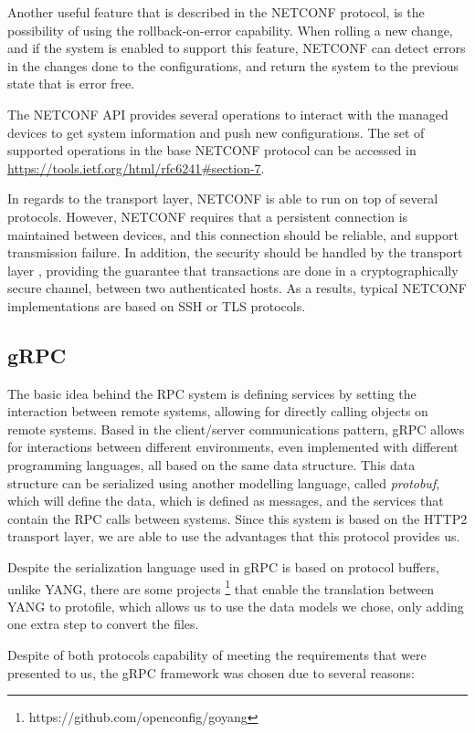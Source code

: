 \par Another useful feature that is described in the NETCONF protocol, is the possibility of using the rollback-on-error capability. When rolling a new change, and if the system is enabled to support this feature,
NETCONF can detect errors in the changes done to the configurations, and return the system to the previous state that is error free. 

\par The NETCONF API provides several operations to interact with the managed devices to get system information and push new configurations. The set of supported operations in the base NETCONF protocol can be accessed in 
\url{https://tools.ietf.org/html/rfc6241#section-7}. 

\par In regards to the transport layer, NETCONF is able to run on top of several protocols. However, NETCONF requires that a persistent connection is maintained between devices, and this connection should be reliable, and support
transmission failure. In addition, the security should be handled by the transport layer \cite { CITE - https://www.ietf.org/slides/slides-edu-netconf-yang-00.pdf}, providing the guarantee that transactions are done in a 
cryptographically secure channel, between two authenticated hosts. As a results, typical NETCONF implementations are based on SSH or TLS protocols.

\subsection {gRPC}  \label {ssec:grpc}

The basic idea behind the RPC system is defining services by setting the interaction between remote systems, allowing for directly calling objects on remote systems. Based in the client/server communications 
pattern, gRPC allows for interactions between different environments, even implemented with different programming languages, all based on the same data structure. This data structure can be serialized using another modelling 
language, called \textit {protobuf}, which will define the data, which is defined as messages, and the services that contain the RPC calls between systems. Since this system is based on the HTTP2 transport layer, we are able to
use the advantages that this protocol provides us.
\par Despite the serialization language used in gRPC is based on protocol buffers, unlike YANG, there are some projects \footnote {https://github.com/openconfig/goyang} that enable the translation between YANG to protofile,
which allows us to use the data models we chose, only adding one extra step to convert the files.
\par Despite of both protocols capability of meeting the requirements that were presented to us, the gRPC framework was chosen due to several reasons:

